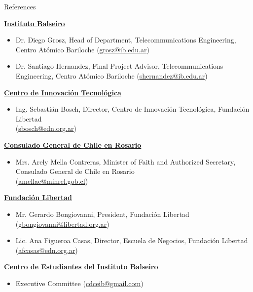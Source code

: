 \documentclass{resume} %
\begin{document}
\begin{rSection}{References}
    \begin{enumerate}[label={[\arabic*]}]
        \item \label{ib} \href{https://www.ib.edu.ar/}{\textbf{Instituto Balseiro}}
              \begin{itemize}
                  \item Dr. Diego Grosz, Head of Department, Telecommunications Engineering, Centro Atómico Bariloche (\href{mailto:grosz@ib.edu.ar}{grosz@ib.edu.ar})
                  \item Dr. Santiago Hernandez, Final
                        Project Advisor,  Telecommunications  Engineering,  Centro  Atómico Bariloche (\href{mailto:shernandez@ib.edu.ar}{shernandez@ib.edu.ar})
              \end{itemize}
        \item \label{cit} \href{https://www.centroit.org.ar/}{\textbf{Centro de Innovación Tecnológica}}
              \begin{itemize}
                  \item Ing. Sebastián Bosch, Director, Centro de Innovación Tecnológica, Fundación Libertad\\(\href{mailto:sbosch@edn.org.ar}{sbosch@edn.org.ar})
              \end{itemize}
        \item \label{chile} \href{https://chile.gob.cl/rosario/}{\textbf{Consulado General de Chile en Rosario}}
              \begin{itemize}
                  \item Mrs. Arely Mella Contreras, Minister of Faith and Authorized Secretary, Consulado General de Chile en Rosario\\(\href{mailto:amellac@minrel.gob.cl}{amellac@minrel.gob.cl})
              \end{itemize}
        \item \label{funlib} \href{https://libertad.org.ar/}{\textbf{Fundación Libertad}}
              \begin{itemize}
                  \item Mr. Gerardo Bongiovanni, President, Fundación Libertad (\href{mailto:gbongiovanni@libertad.org.ar}{gbongiovanni@libertad.org.ar})
                  \item Lic. Ana Figueroa Casas, Director, Escuela de Negocios, Fundación Libertad\\(\href{mailto:afcasas@edn.org.ar}{afcasas@edn.org.ar})
              \end{itemize}
        \item \label{ceib} \textbf{Centro de Estudiantes del Instituto Balseiro}
              \begin{itemize}
                  \item Executive Committee (\href{mailto:cdceib@gmail.com}{cdceib@gmail.com})
              \end{itemize}
    \end{enumerate}

\end{rSection}

\end{document}
